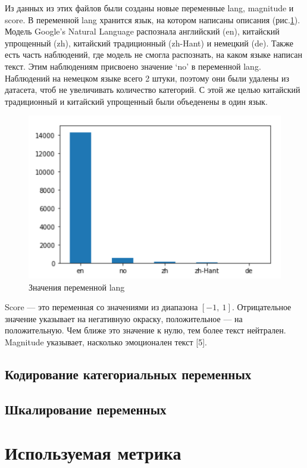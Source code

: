 \documentclass[14pt]{mmcs_article}
\begin{document}
Из данных из этих файлов были созданы новые переменные lang, magnitude и score. В переменной lang хранится язык, на котором написаны описания (рис.\ref{analyse:lang}). Модель Google’s Natural Language распознала английский (en), китайский упрощенный (zh), китайский традиционный (zh-Hant) и немецкий (de). Также есть часть наблюдений, где модель не смогла распознать, на каком языке написан текст. Этим наблюдениям присвоено значение `no' в переменной lang. Наблюдений на немецком языке всего 2 штуки, поэтому они были удалены из датасета, чтоб не увеличивать количество категорий. С этой же целью китайский традиционный и китайский упрощенный были объеденены в один язык. 

\begin{figure}[H]
	\centering
	\includegraphics[scale=1.2]{lang.png}
	\caption{Значения переменной lang}\label{analyse:lang}
\end{figure}

Score --- это переменная со значениями из диапазона $[-1,\ 1]$. Отрицательное значение указывает на негативную окраску, положительное --- на положительную. Чем ближе это значение к нулю, тем более текст нейтрален. Magnitude указывает, насколько эмоционален текст [5]. 


\subsection{Кодирование категориальных переменных}

\subsection{Шкалирование переменных}

\newpage
\section{Используемая метрика}
\end{document}
